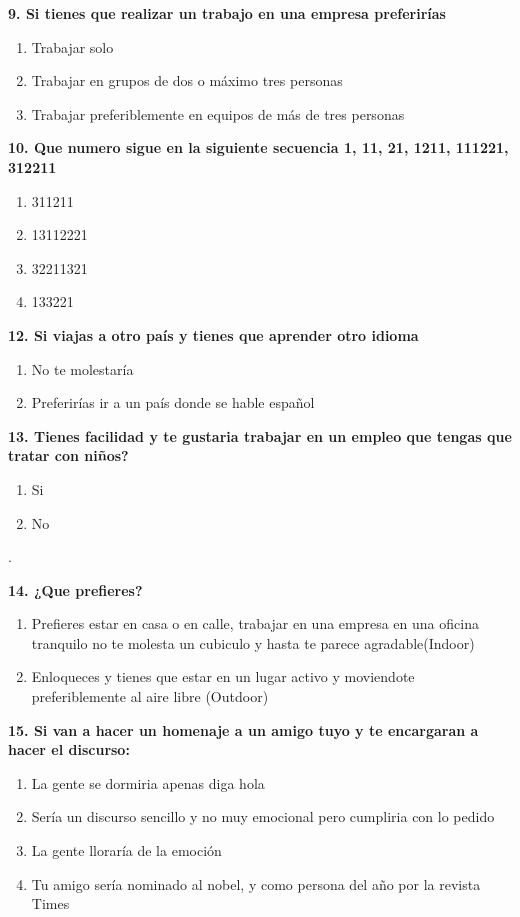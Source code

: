 \documentclass{article}
\begin{document}
\textbf{9. Si tienes que realizar un trabajo en una empresa preferirías}
\begin{enumerate}[label=(\Alph*)] 
\item Trabajar solo
\item Trabajar en grupos de dos o máximo tres personas
\item Trabajar preferiblemente en equipos de más de tres personas
 
\end{enumerate}

\textbf{10. Que numero sigue en la siguiente secuencia 1, 11, 21, 1211, 111221, 312211}
\begin{enumerate}[label=(\Alph*)] 
\item 311211
\item 13112221
\item 32211321
\item 133221
\end{enumerate}

\textbf{12. Si viajas a otro país y tienes que aprender otro idioma}
\begin{enumerate}[label=(\Alph*)] 
\item No te molestaría
\item Preferirías ir a un país donde se hable español
\end{enumerate}

\textbf{13. Tienes facilidad y te gustaria trabajar en un empleo que tengas que tratar con niños?}
\begin{enumerate}[label=(\Alph*)]
\item Si
\item No 
\end{enumerate}.  

\textbf{14. ¿Que prefieres?}
\begin{enumerate}[label=(\Alph*)] 
\item Prefieres estar en casa o en calle, trabajar en una empresa en una oficina tranquilo no te molesta un cubiculo y hasta te parece agradable(Indoor)
\item Enloqueces y tienes que estar en un lugar activo y moviendote preferiblemente al aire libre (Outdoor)
\end{enumerate}
\pagebreak
\textbf{15. Si van a hacer un homenaje a un amigo tuyo y te encargaran a hacer el discurso:}
\begin{enumerate}[label=(\Alph*)] 
\item La gente  se dormiria apenas diga hola
\item Sería un discurso sencillo y no muy emocional pero cumpliria con lo pedido
\item La gente lloraría de la emoción
\item Tu amigo sería nominado al nobel, y como persona del año por la revista Times
\end{enumerate}
\end{document}
